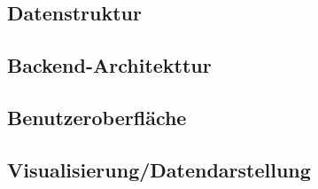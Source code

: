 \subsection{Datenstruktur}

\subsection{Backend-Architekttur}

\subsection{Benutzeroberfläche}

\subsection{Visualisierung/Datendarstellung}
